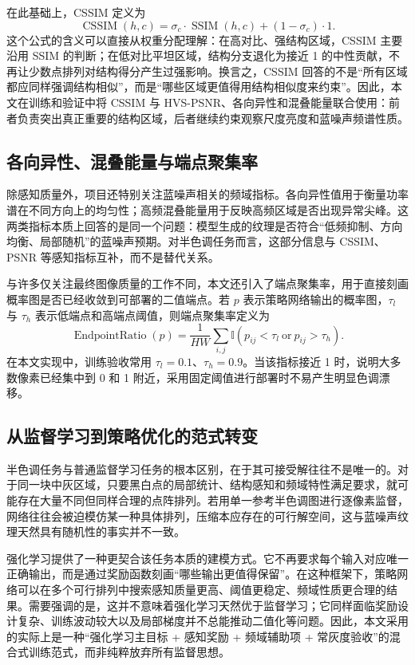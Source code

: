 \documentclass[thesis]{../zstucs-graduation-project}
\begin{document}
在此基础上，CSSIM 定义为
\begin{equation}
\operatorname{CSSIM}(h,c)=\sigma_c\cdot\operatorname{SSIM}(h,c) + (1-\sigma_c)\cdot 1.
\label{eq:2-7}
\end{equation}
这个公式的含义可以直接从权重分配理解：在高对比、强结构区域，CSSIM 主要沿用 SSIM 的判断；在低对比平坦区域，结构分支退化为接近 1 的中性贡献，不再让少数点排列对结构得分产生过强影响。换言之，CSSIM 回答的不是“所有区域都应同样强调结构相似”，而是“哪些区域更值得用结构相似度来约束”。因此，本文在训练和验证中将 CSSIM 与 HVS-PSNR、各向异性和混叠能量联合使用：前者负责突出真正重要的结构区域，后者继续约束观察尺度亮度和蓝噪声频谱性质。

\subsection{各向异性、混叠能量与端点聚集率}
除感知质量外，项目还特别关注蓝噪声相关的频域指标。各向异性值用于衡量功率谱在不同方向上的均匀性；高频混叠能量用于反映高频区域是否出现异常尖峰。这两类指标本质上回答的是同一个问题：模型生成的纹理是否符合“低频抑制、方向均衡、局部随机”的蓝噪声预期。对半色调任务而言，这部分信息与 CSSIM、PSNR 等感知指标互补，而不是替代关系。

与许多仅关注最终图像质量的工作不同，本文还引入了端点聚集率，用于直接刻画概率图是否已经收敛到可部署的二值端点。若 $p$ 表示策略网络输出的概率图，$\tau_l$ 与 $\tau_h$ 表示低端点和高端点阈值，则端点聚集率定义为
\begin{equation}
\operatorname{EndpointRatio}(p)=\frac{1}{HW}\sum_{i,j}\mathbb{I}\left(p_{ij}<\tau_l\ \text{or}\ p_{ij}>\tau_h\right).
\label{eq:2-8}
\end{equation}
在本文实现中，训练验收常用 $\tau_l=0.1$、$\tau_h=0.9$。当该指标接近 1 时，说明大多数像素已经集中到 0 和 1 附近，采用固定阈值进行部署时不易产生明显色调漂移。

\subsection{从监督学习到策略优化的范式转变}
半色调任务与普通监督学习任务的根本区别，在于其可接受解往往不是唯一的。对于同一块中灰区域，只要黑白点的局部统计、结构感知和频域特性满足要求，就可能存在大量不同但同样合理的点阵排列。若用单一参考半色调图进行逐像素监督，网络往往会被迫模仿某一种具体排列，压缩本应存在的可行解空间，这与蓝噪声纹理天然具有随机性的事实并不一致。

强化学习提供了一种更契合该任务本质的建模方式。它不再要求每个输入对应唯一正确输出，而是通过奖励函数刻画“哪些输出更值得保留”。在这种框架下，策略网络可以在多个可行排列中搜索感知质量更高、阈值更稳定、频域性质更合理的结果。需要强调的是，这并不意味着强化学习天然优于监督学习；它同样面临奖励设计复杂、训练波动较大以及局部梯度并不总能推动二值化等问题。因此，本文采用的实际上是一种“强化学习主目标 + 感知奖励 + 频域辅助项 + 常灰度验收”的混合式训练范式，而非纯粹放弃所有监督思想。
\end{document}

